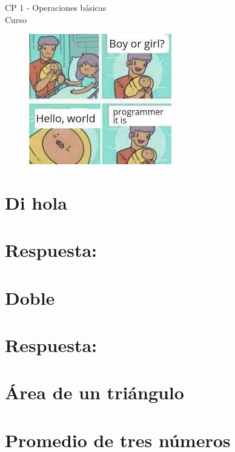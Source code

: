 \begin{center}
    \begin{large}
    CP 1 - Operaciones básicas\\
    Curso \academicyear\\
    \end{large}
    
\begin{figure}[h]
    \centering
    \includegraphics[width=0.4\linewidth]{cp2/hello_world.jpg}
\end{figure}
\end{center}

\section{Di hola}

\ifshowanswers
\section*{Respuesta:}

\fi

\section{Doble}

\ifshowanswers
\section*{Respuesta:}

\fi

\section{Área de un triángulo}


\section{Promedio de tres números}


